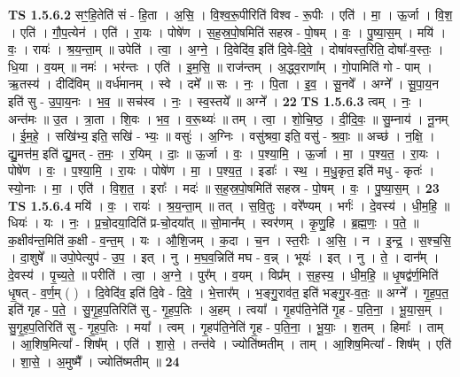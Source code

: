 \documentclass[17pt]{extarticle}
\begin{document}
                  \newline
                                \textbf{ TS 1.5.6.2} \newline
                  सꣳ॒॒हि॒तेति॑ सं - हि॒ता । अ॒सि॒ । वि॒श्व॒रू॒पीरिति॑ विश्व - रू॒पीः । एति॑ । मा॒ । ऊ॒र्जा । वि॒श॒ । एति॑ । गौ॒प॒त्येन॑ । एति॑ । रा॒यः । पोषे॑ण । स॒ह॒स्र॒पो॒षमिति॑ सहस्र - पो॒षम् । वः॒ । पु॒ष्या॒स॒म् । मयि॑ । वः॒ । रायः॑ । श्र॒य॒न्ता॒म् ॥ उपेति॑ । त्वा॒ । अ॒ग्ने॒ । दि॒वेदि॑व॒ इति॑ दि॒वे-दि॒वे॒ । दोषा॑वस्त॒रिति॒ दोषा᳚-व॒स्तः॒ । धि॒या । व॒यम् ॥ नमः॑ । भर॑न्तः । एति॑ । इ॒म॒सि॒ ॥ राज॑न्तम् । अ॒द्ध्व॒राणा᳚म् । गो॒पामिति॑ गो - पाम् । ऋ॒तस्य॑ । दीदि॑विम् ॥ वर्ध॑मानम् । स्वे । दमे᳚ ॥ सः । नः॒ । पि॒ता । इ॒व॒ । सू॒नवे᳚ । अग्ने᳚ । सू॒पा॒य॒न इति॑ सु - उ॒पा॒य॒नः । भ॒व॒ ॥ सच॑स्व ।  नः॒ । स्व॒स्तये᳚ ॥ अग्ने᳚ । \textbf{  22} \newline
                  \newline
                                \textbf{ TS 1.5.6.3} \newline
                  त्वम् । नः॒ । अन्त॑मः ॥ उ॒त । त्रा॒ता । शि॒वः । भ॒व॒ । व॒रू॒थ्यः॑ ॥ तम् । त्वा॒ । शो॒चि॒ष्ठ॒ । दी॒दि॒वः॒ ॥ सु॒म्नाय॑ । नू॒नम् । ई॒म॒हे॒ । सखि॑भ्य॒ इति॒ सखि॑ - भ्यः॒ ॥ वसुः॑ । अ॒ग्निः । वसु॑श्रवा॒ इति॒ वसु॑ - श्र॒वाः॒ ॥ अच्छ॑ । न॒क्षि॒ । द्यु॒मत्त॑म॒ इति॑ द्यु॒मत् - त॒मः॒ । र॒यिम् । दाः॒ ॥ ऊ॒र्जा । वः॒ । प॒श्या॒मि॒ । ऊ॒र्जा । मा॒ । प॒श्य॒त॒ । रा॒यः । पोषे॑ण । वः॒ । प॒श्या॒मि॒ । रा॒यः । पोषे॑ण । मा॒ । प॒श्य॒त॒ । इडाः᳚ । स्थ॒ । म॒धु॒कृत॒ इति॑ मधु - कृतः॑ । स्यो॒नाः । मा॒ । एति॑ । वि॒श॒त॒ । इराः᳚ । मदः॑ ॥ स॒ह॒स्र॒पो॒षमिति॑ सहस्र - पो॒षम् । वः॒ । पु॒ष्या॒स॒म् । \textbf{  23} \newline
                  \newline
                                \textbf{ TS 1.5.6.4} \newline
                  मयि॑ । वः॒ । रायः॑ । श्र॒य॒न्ता॒म् ॥ तत् । स॒वि॒तुः । वरे᳚ण्यम् । भर्गः॑ । दे॒वस्य॑ । धी॒म॒हि॒ ॥ धियः॑ । यः । नः॒ । प्र॒चो॒दया॒दिति॑ प्र-चो॒दया᳚त् ॥ सो॒मान᳚म् । स्वर॑णम् । कृ॒णु॒हि । ब्र॒ह्म॒णः॒ । प॒ते॒ ॥ क॒क्षीव॑न्त॒मिति॑ क॒क्षी - व॒न्त॒म् । यः । औ॒शि॒जम् । क॒दा । च॒न । स्त॒रीः । अ॒सि॒ । न । इ॒न्द्र॒ । स॒श्च॒सि॒ । दा॒शुषे᳚ ॥ उपो॒पेत्युप॑ - उ॒प॒ । इत् । नु । म॒घ॒व॒न्निति॑ मघ - व॒न्न् । भूयः॑ । इत् । नु । ते॒ । दान᳚म् । दे॒वस्य॑ । पृ॒च्य॒ते॒ ॥ परीति॑ । त्वा॒ । अ॒ग्ने॒ । पुर᳚म् । व॒यम् । विप्र᳚म् । स॒ह॒स्य॒ । धी॒म॒हि॒ ॥ धृ॒षद्व॑र्ण॒मिति॑ धृ॒षत् - व॒र्ण॒म् ( ) । दि॒वेदि॑व॒ इति॑ दि॒वे - दि॒वे॒ । भे॒त्तार᳚म् । भ॒ङ्गु॒राव॑त॒ इति॑ भङ्गु॒र-व॒तः॒ ॥ अग्ने᳚ । गृ॒ह॒प॒त॒ इति॑ गृह - प॒ते॒ । सु॒गृ॒ह॒प॒तिरिति॑ सु - गृ॒ह॒प॒तिः । अ॒हम् । त्वया᳚ । गृ॒हप॑ति॒नेति॑ गृ॒ह - प॒ति॒ना॒ । भू॒या॒स॒म् । सु॒गृ॒ह॒प॒तिरिति॑ सु - गृ॒ह॒प॒तिः । मया᳚ । त्वम् । गृ॒हप॑ति॒नेति॑ गृ॒ह - प॒ति॒ना॒ । भू॒याः॒ । श॒तम् । हिमाः᳚ । ताम् । आ॒शिष॒मित्या᳚ - शिष᳚म् । एति॑ । शा॒से॒ । तन्त॑वे । ज्योति॑ष्मतीम् । ताम् । आ॒शिष॒मित्या᳚ - शिष᳚म् । एति॑ । शा॒से॒ । अ॒मुष्मै᳚ । ज्योति॑ष्मतीम् ॥ \textbf{  24} \newline
\end{document}
